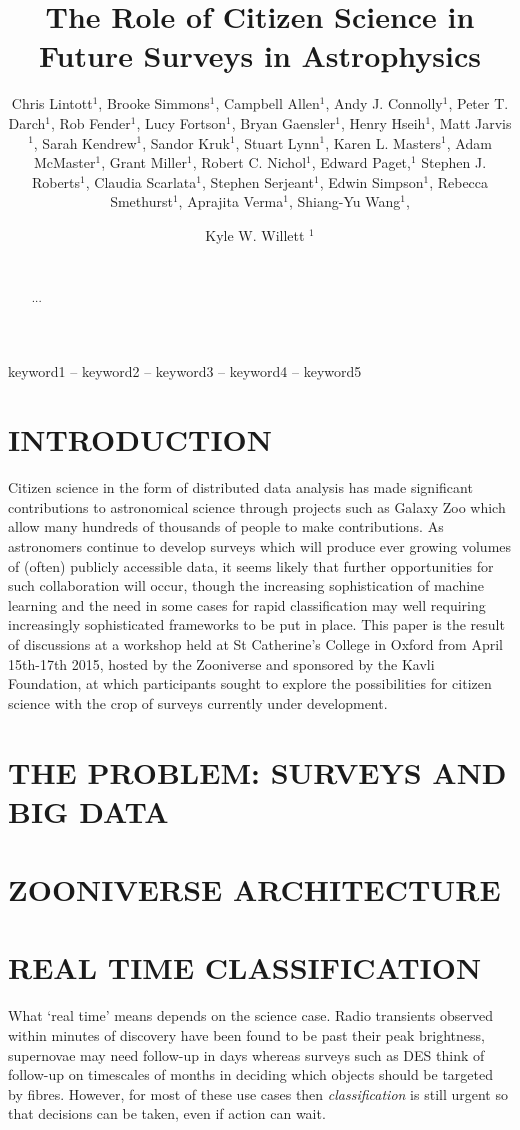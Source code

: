 \documentclass{pasa}
\title[Future Surveys and Citizen Science]{The Role of Citizen Science in Future Surveys in Astrophysics}
\author[Lintott et al.]{Chris Lintott$^1$, Brooke Simmons$^1$, Campbell Allen$^1$, Andy J. Connolly$^1$, Peter T. Darch$^1$, Rob Fender$^1$, Lucy Fortson$^1$, Bryan Gaensler$^1$, Henry Hseih$^1$, Matt Jarvis$^1$, Sarah Kendrew$^1$, Sandor Kruk$^1$, Stuart Lynn$^1$, Karen L. Masters$^1$, Adam McMaster$^1$, Grant Miller$^1$, Robert C. Nichol$^1$, Edward Paget,$^1$ Stephen J. Roberts$^1$, Claudia Scarlata$^1$, Stephen Serjeant$^1$, Edwin Simpson$^1$, Rebecca Smethurst$^1$, Aprajita Verma$^1$, Shiang-Yu Wang$^1$, \and Kyle W. Willett $^1$
\\ 
\\%
\affil{$^1$St. Catherine's College, Oxford University}}%
\begin{document}
%
%
\begin{abstract}

...

\end{abstract}
%
\begin{keywords}
keyword1 -- keyword2 -- keyword3 -- keyword4 -- keyword5
\end{keywords}
%
\maketitle%
%
\section{INTRODUCTION }
\label{sec:intro}

Citizen science in the form of distributed data analysis has made significant contributions to astronomical science through projects such as Galaxy Zoo which allow many hundreds of thousands of people to make contributions. As astronomers continue to develop surveys which will produce ever growing volumes of (often) publicly accessible data, it seems likely that further opportunities for such collaboration will occur, though the increasing sophistication of machine learning and the need in some cases for rapid classification may well requiring increasingly sophisticated frameworks to be put in place. This paper is the result of discussions at a workshop held at St Catherine's College in Oxford from April 15th-17th 2015, hosted by the Zooniverse and sponsored by the Kavli Foundation, at which participants sought to explore the possibilities for citizen science with the crop of surveys currently under development. 

\section{THE PROBLEM: SURVEYS AND BIG DATA }
\label{sec:problem}

\section{ZOONIVERSE ARCHITECTURE}
\label{sec:zoo}

\section{REAL TIME CLASSIFICATION}
\label{sec:realtime}

What `real time' means depends on the science case. Radio transients observed within minutes of discovery have been found to be past their peak brightness, supernovae may need follow-up in days whereas surveys such as DES think of follow-up on timescales of months in deciding which objects should be targeted by fibres. However, for most of these use cases then \emph{classification} is still urgent so that decisions can be taken, even if action can wait. 
\end{document}
